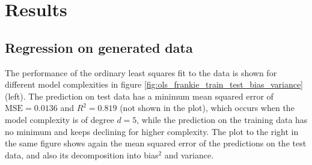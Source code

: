 \section{Results}\label{sec:Results}

\subsection{Regression on generated data}
The performance of the ordinary least squares fit to the data is shown for different model complexities in figure \ref{fig:ols_frankie_train_test_bias_variance} (left). The prediction on test data has a minimum mean squared error of $\text{MSE} = 0.0136$ and $R^2 = 0.819$ (not shown in the plot), which occurs when the model complexity is of degree $d=5$, while the prediction on the training data has no minimum and keeps declining for higher complexity. The plot to the right in the same figure shows again the mean squared error of the predictions on the test data, and also its decomposition into bias$^2$ and variance. 
